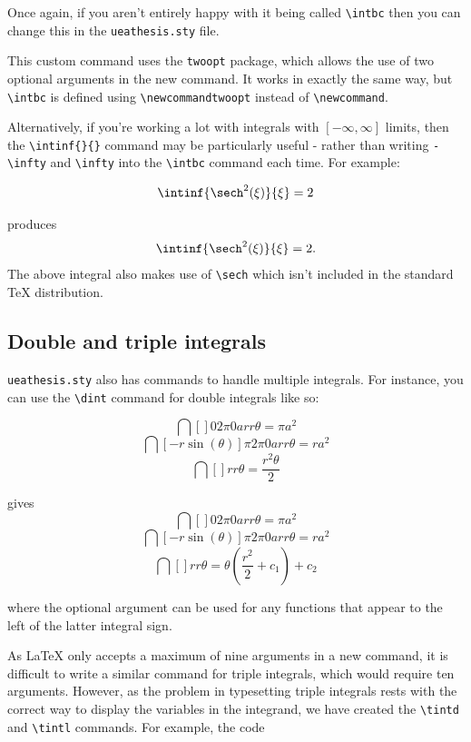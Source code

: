 Once again, if you aren't entirely happy with it being called \verb|\intbc| then you can change this in the \verb|ueathesis.sty| file.

\begin{remark}
This custom command uses the \verb|twoopt| package, which allows the use of two optional arguments in the new command. It works in exactly the same way, but \verb|\intbc| is defined using \verb|\newcommandtwoopt| instead of \verb|\newcommand|. 
\end{remark}

Alternatively, if you're working a lot with integrals with $[-\infty,\infty]$ limits, then the \verb|\intinf{}{}| command may be particularly useful - rather than writing \verb|-\infty| and \verb|\infty| into the \verb|\intbc| command each time. For example:
\begin{spverbatim}
\[\intinf{\sech^2(\xi)}{\xi} = 2\]
\end{spverbatim}
produces
\[\intinf{\sech^2(\xi)}{\xi} = 2.\]
The above integral also makes use of \verb|\sech| which isn't included in the standard \TeX{} distribution.

\subsection{Double and triple integrals}

\verb|ueathesis.sty| also has commands to handle multiple integrals. For instance, you can use the \verb|\dint| command for double integrals like so:

\begin{spverbatim}
\[\dint[]{0}{2\pi}{0}{a}{r}{r}{\theta} = \pi a^2\]
\[\dint[-r\sin(\theta)]{\pi}{2\pi}{0}{a}{r}{r}{\theta} = r a^2\]
\[\dint[]{}{}{}{}{r}{r}{\theta} = \frac{r^2\theta}{2}\]
\end{spverbatim}
gives
\[\dint[]{0}{2\pi}{0}{a}{r}{r}{\theta} = \pi a^2\]
\[\dint[-r\sin(\theta)]{\pi}{2\pi}{0}{a}{r}{r}{\theta} = r a^2\]
\[\dint[]{}{}{}{}{r}{r}{\theta} = \theta\left(\frac{r^2}{2}+c_1\right)+c_2\]

where the optional argument can be used for any functions that appear to the left of the latter integral sign.

As \LaTeX{} only accepts a maximum of nine arguments in a new command, it is difficult to write a similar command for triple integrals, which would require ten arguments. However, as the problem in typesetting triple integrals rests with the correct way to display the variables in the integrand, we have created the \verb|\tintd| and \verb|\tintl| commands. For example, the code

